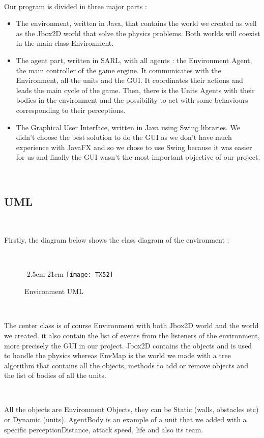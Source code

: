 \documentclass[a4paper,10pt]{book}
\begin{document}
~

Our program is divided in three major parts :
\begin{itemize}
 \item The environment, written in Java, that contains the world we created as well as the Jbox2D world that solve the physics
 problems. Both worlds will coexist in the main class Environment.
 \item The agent part, written in SARL, with all agents : the Environment Agent, the main controller of the game engine. It
 communicates with the Environment, all the units and the GUI. It coordinates their actions and leads the main cycle of the game.
 Then, there is the Units Agents with their bodies in the environment and the possibility to act with some behaviours corresponding to
 their perceptions.
 \item The Graphical User Interface, written in Java using Swing libraries. We didn't choose the best solution to do the GUI as
 we don't have much experience with JavaFX and so we chose to use Swing because it was easier for us and finally the GUI wasn't the most
 important objective of our project.
\end{itemize}

~

\subsection{UML}

~

Firstly, the diagram below shows the class diagram of the environment :

~

\begin{figure}[!h]
  -2.5cm 21cm
 \centering
 \texttt{[image: TX52]}
 \caption{Environment UML}
\end{figure}

~

The center class is of course Environment with both Jbox2D world and the world we created. it also contain the list of events
from the listeners of the environment, more precisely the GUI in our project. Jbox2D contains the objects and is used to handle
the physics whereas EnvMap is the world we made with a tree algorithm that contains all the objects, methods to add or remove objects
and the list of bodies of all the units.

~

All the objects are Environment Objects, they can be Static (walls, obstacles etc) or Dynamic (units). AgentBody is an example of a unit
that we added with a specific perceptionDistance, attack speed, life and also its team.
\end{document}
